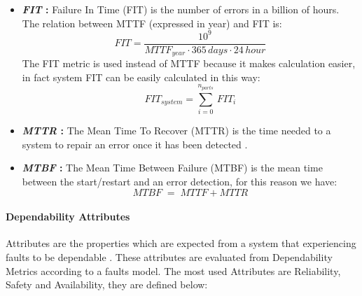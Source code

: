 {{{{\begin{itemize}
					\item \textbf{\textit{FIT} : } Failure In Time (FIT) is the number of errors in a billion of hours. The relation between MTTF (expressed in year) and FIT is:
					\begin{equation}
					FIT = \dfrac{10^9}{MTTF_{year}\cdot 365 \,days\cdot 24\,hour}
					\end{equation} 
					The FIT metric is used instead of MTTF because it makes calculation easier, in fact system FIT can be easily calculated in this way:
					\begin{equation}
					FIT_{system} = \sum_{i=0}^{n_{parts}}\,FIT_i
					\end{equation}
					
					\item \textbf{\textit{MTTR} : } The Mean Time To Recover (MTTR) is the time needed to a system to repair an error once it has been detected  .
					
					\item \textbf{\textit{MTBF} : } The Mean Time Between Failure (MTBF) is the mean time between the start/restart and an error detection, for this reason we have:
					\begin{equation}
						MTBF\;=\;MTTF+MTTR
					\end{equation}
				\end{itemize} 
			} %
			\paragraph{Dependability Attributes}{
				Attributes are the properties which are expected from a system that experiencing faults to be dependable . These attributes are evaluated from Dependability Metrics according to a faults model. The most used Attributes are Reliability, Safety and Availability, they are defined below: 
				\begin{itemize}
					

\end{itemize}}}}}
